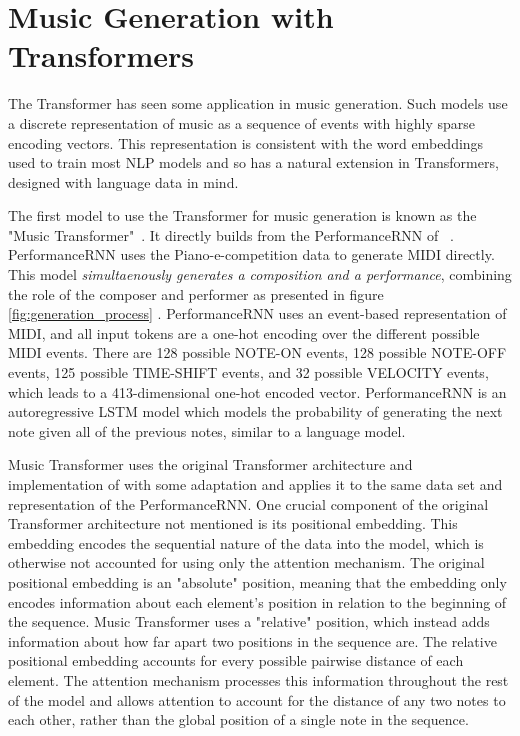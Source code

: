 
\section{Music Generation with Transformers}
The Transformer has seen some application in music generation. Such models use a discrete representation of music as a sequence of events with highly sparse encoding vectors. This representation is consistent with the word embeddings used to train most NLP models and so has a natural extension in Transformers, designed with language data in mind. 

The first model to use the Transformer for music generation is known as the "Music Transformer"~\cite{huang2018music}. It directly builds from the PerformanceRNN of ~\citet{oore2020time}. PerformanceRNN uses the Piano-e-competition data to generate MIDI directly. This model \emph{simultaenously generates a composition and a performance}, combining the role of the composer and performer as presented in figure \ref{fig:generation_process} . PerformanceRNN uses an event-based representation of MIDI, and all input tokens are a one-hot encoding over the different possible MIDI events. There are 128 possible NOTE-ON events, 128 possible NOTE-OFF events, 125 possible TIME-SHIFT events, and 32 possible VELOCITY events, which leads to a 413-dimensional one-hot encoded vector. PerformanceRNN is an autoregressive LSTM model which models the probability of generating the next note given all of the previous notes, similar to a language model. 

Music Transformer uses the original Transformer architecture and implementation of \citet{vaswani2017attention} with some adaptation and applies it to the same data set and representation of the PerformanceRNN. One crucial component of the original Transformer architecture not mentioned is its positional embedding. This embedding encodes the sequential nature of the data into the model, which is otherwise not accounted for using only the attention mechanism. The original positional embedding is an "absolute" position, meaning that the embedding only encodes information about each element's position in relation to the beginning of the sequence. Music Transformer uses a "relative" position, which instead adds information about how far apart two positions in the sequence are. The relative positional embedding accounts for every possible pairwise distance of each element. The attention mechanism processes this information throughout the rest of the model and allows attention to account for the distance of any two notes to each other, rather than the global position of a single note in the sequence. 

